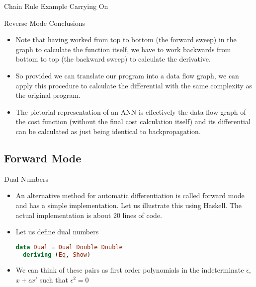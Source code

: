 \documentclass{beamer}
\begin{document}
\begin{frame}[fragile]{Chain Rule Example Carrying On}
\end{frame}


\begin{frame}[fragile]{Reverse Mode Conclusions}
\begin{itemize}
\item
Note that having worked from top to bottom (the forward sweep) in the
graph to calculate the function itself, we have to work backwards from
bottom to top (the backward sweep) to calculate the derivative.
\item
So provided we can translate our program into a data flow graph, we can
apply this procedure to calculate the differential with the same
complexity as the original program.
\item
The pictorial representation of an ANN is effectively the data flow
graph of the cost function (without the final cost calculation itself)
and its differential can be calculated as just being identical to
backpropagation.
\end{itemize}
\end{frame}

\subsection{Forward Mode}

\begin{frame}[fragile]{Dual Numbers}
\begin{itemize}
\item
An alternative method for automatic differentiation is called forward
mode and has a simple implementation. Let us illustrate this using
Haskell. The actual implementation is about 20 lines of code.
\item
Let us define dual numbers

\begin{lstlisting}[language=Haskell]
data Dual = Dual Double Double
  deriving (Eq, Show)
\end{lstlisting}
\item
We can think of these pairs as first order polynomials in the
indeterminate $\epsilon$, $x + \epsilon x'$ such that $\epsilon^2 = 0$
\end{itemize}
\end{frame}
\end{document}
